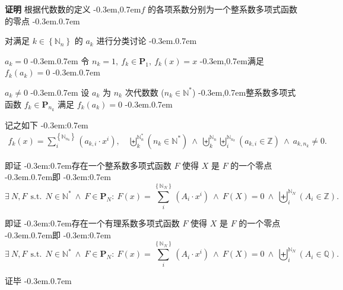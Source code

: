\documentclass{article}
\newcommand\BrSetN[1]{\Set{\MathPartialSetN{#1}}}
\newcommand\InPartialSetN[2]{\InSet{#1}{\BrSetN{#2}}}
\newcommand\InSetQ[1]{\InSet{#1}{\MathSetQ}}
\newcommand\InSetU[1]{\InSet{#1}{\MathSetU}}
\newcommand\InSetZ[1]{\InSet{#1}{\MathSetZ}}
\newcommand\MathPartialSetN[1]{\mathbb{N}_{#1}}
\newcommand\MathPartialSetU[1]{\mathbb{N}^{\ast}_{#1}}
\newcommand\MathSetQ{\mathbb{Q}}
\newcommand\MathSetU{\mathbb{N}^{\ast}}
\newcommand\MathSetZ{\mathbb{Z}}
\newcommand\SeqOfNInSetQ[3]{\SeqOfN{#1}{#2} \Bracket{\InSetQ{#3_{#1}}}}
\newcommand\SeqOfNInSetZ[3]{\SeqOfN{#1}{#2} \Bracket{\InSetZ{#3_{#1}}}}
\newcommand\SeqOfUInSetU[3]{\SeqOfU{#1}{#2} \Bracket{\InSetU{#3_{#1}}}}
\newcommand\SeqOfN[2]{\Seq{#1}{\MathPartialSetN{#2}}}
\newcommand\SeqOfU[2]{\Seq{#1}{\MathPartialSetU{#2}}}
\newcommand\SumOfN[2]{\sum_{#1}^{\BrSetN{#2}}}
\newcommand\Appose{\Comma}
\newcommand\Bracket[1]{\left( #1 \right)}
\newcommand\BracketBig[1]{\left\{ #1 \right\}}
\newcommand\Colon{:}
\newcommand\Comma{,}
\newcommand\CommaAnd{\Space{\Comma}}
\newcommand\CommaSub{\Comma}
\newcommand\Domain[1]{\DomainComma \quad #1}
\newcommand\DomainAnd{\LogicAnd}
\newcommand\DomainComma{\Comma}
\newcommand\Enumerate[1]{#1^{\circ}}
\newcommand\Exists[3]{\Satisfy{\exists}{#1}{#2}{#3}}
\newcommand\Func[2]{#1 \Bracket{#2}}
\newcommand\InSet[2]{#1 \in #2}
\newcommand\InPolynomialSet[2]{\InSet{#1}{\PolynomialSet{#2}}}
\newcommand\Logic[1]{\ #1\ }
\newcommand\LogicAnd{\Logic{\wedge}}
\newcommand\MultiSub[2]{#1 \CommaSub #2}
\newcommand\NeqZero[1]{#1 \neq 0}
\newcommand\Polynomial[2]{\SumOfN{i}{#1} \Bracket{#2_{i} \cdot x^{i}}}
\newcommand\PolynomialA[1]{\PolynomialSub{#1}{a}{n}}
\newcommand\PolynomialSet[1]{\mathbf{P}_{#1}}
\newcommand\PolynomialSub[3]{\SumOfN{i}{#3_{#1}} \Bracket{#2_{\MultiSub{#1}{i}} \cdot x^{i}}}
\newcommand\Satisfy[4]{\Space{#1} #2 \SuchThat #3 \Space{\Colon} #4}
\newcommand\Seq[2]{\biguplus_{#1}^{#2}}
\newcommand\Set[1]{\BracketBig{#1}}
\newcommand\Space[1]{#1\ }
\newcommand\SuchThat{\Logic{\Logic{\text{s.t.}}}}
\newcommand\BmEnumerate[1]{\bm{$\Enumerate{#1}$} \quad}
\newcommand\Category[2]{\BmEnumerate{#1} #2 \TextPeriod}
\newcommand\EqEndPeriod{.}
\newcommand\SubTitle[1]{\textbf{#1} \quad}
\newcommand\TextBracket[1]{(#1)}
\newcommand\TextColon{\TextPunctuation{\Colon}}
\newcommand\TextComma{\TextPunctuation{\Comma}}
\newcommand\TextPeriod{\TextPunctuation{.}}
\newcommand\TextPunctuation[1]{\kern -0.3em#1\kern 0.7em}
\newenvironment{proof}{\SubTitle{证明}}{\par 证毕 \TextPeriod}
\begin{document}
	\begin{proof}
		根据代数数的定义 \TextComma $f$ 的各项系数分别为一个整系数多项式函数的零点 \TextPeriod
		
		对满足 $\InPartialSetN{k}{n}$ 的 $a_{k}$ 进行分类讨论 \TextPeriod
		
		\Category{1}{$a_{k} = 0$} 令 $n_{k} = 1 \CommaAnd \InPolynomialSet{f_{k}}{1} \CommaAnd \Func{f_{k}}{x} = x$ \TextComma 满足 $\Func{f_{k}}{a_{k}} = 0$ \TextPeriod
		
		\Category{2}{$\NeqZero{a_{k}}$} 设 $a_{k}$ 为 $n_{k}$ 次代数数 \TextBracket{$\InSetU{n_{k}}$} \TextComma 整系数多项式函数 $\InPolynomialSet{f_{k}}{n_{k}}$ 满足 $\Func{f_{k}}{a_{k}} = 0$ \TextPeriod
		
		记之如下 \TextColon
		\begin{align*}
		\Func{f_{k}}{x} = \PolynomialA{k} \Domain{\SeqOfUInSetU{k}{n}{n} \DomainAnd \SeqOfN{k}{n} \SeqOfN{i}{n_{k}} \Bracket{\InSetZ{a_{\MultiSub{k}{i}}}} \DomainAnd \NeqZero{a_{\MultiSub{k}{n_{k}}}}} \EqEndPeriod
		\end{align*}
		
		即证 \TextColon 存在一个整系数多项式函数 $F$ 使得 $X$ 是 $F$ 的一个零点 \TextPeriod 即 \TextColon
		\begin{equation*}
		\Exists{N \Appose F}{\InSetU{N} \LogicAnd \InPolynomialSet{F}{N}}{\Func{F}{x} = \Polynomial{N}{A} \LogicAnd \Func{F}{X} = 0 \LogicAnd \SeqOfNInSetZ{i}{N}{A}} \EqEndPeriod
		\end{equation*}
		
		即证 \TextColon 存在一个有理系数多项式函数 $F$ 使得 $X$ 是 $F$ 的一个零点 \TextPeriod 即 \TextColon
		\begin{equation*}
		\Exists{N \Appose F}{\InSetU{N} \LogicAnd \InPolynomialSet{F}{N}}{\Func{F}{x} = \Polynomial{N}{A} \LogicAnd \Func{F}{X} = 0 \LogicAnd \SeqOfNInSetQ{i}{N}{A}} \EqEndPeriod
		\end{equation*}
		

\end{proof}
\end{document}
